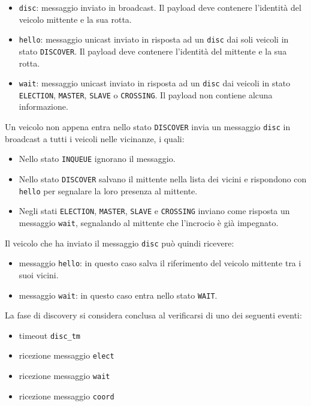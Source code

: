 \documentclass{memoir}
\begin{document}
\begin{itemize}
\item \texttt{disc}: messaggio inviato in broadcast. Il payload deve contenere
  l'identità del veicolo mittente e la sua rotta.
\item \texttt{hello}: messaggio unicast inviato in risposta ad un \texttt{disc}
  dai soli veicoli in stato \texttt{DISCOVER}. Il payload deve contenere
  l'identità del mittente e la sua rotta.
\item \texttt{wait}: messaggio unicast inviato in risposta ad un \texttt{disc}
  dai veicoli in stato \texttt{ELECTION}, \texttt{MASTER}, \texttt{SLAVE} o
  \texttt{CROSSING}. Il payload non contiene alcuna informazione.
\end{itemize} 

Un veicolo non appena entra nello stato \texttt{DISCOVER} invia un messaggio
\texttt{disc} in broadcast a tutti i veicoli nelle vicinanze, i quali:
\begin{itemize}
\item Nello stato \texttt{INQUEUE} ignorano il messaggio.
\item Nello stato \texttt{DISCOVER} salvano il mittente nella lista dei vicini e
  rispondono con \texttt{hello} per segnalare la loro presenza al mittente.
\item Negli stati \texttt{ELECTION}, \texttt{MASTER}, \texttt{SLAVE} e
  \texttt{CROSSING} inviano come risposta un messaggio \texttt{wait}, segnalando
  al mittente che l'incrocio è già impegnato.
\end{itemize}

Il veicolo che ha inviato il messaggio \texttt{disc} può quindi ricevere:
\begin{itemize}
\item messaggio \texttt{hello}: in questo caso salva il riferimento del veicolo
  mittente tra i suoi vicini.
\item messaggio \texttt{wait}: in questo caso entra nello stato \texttt{WAIT}.
\end{itemize}

La fase di discovery si considera conclusa al verificarsi di uno dei seguenti
eventi:
\begin{itemize}
\item timeout \texttt{disc\_tm}
\item ricezione messaggio \texttt{elect}
\item ricezione messaggio \texttt{wait}
\item ricezione messaggio \texttt{coord}
\end{itemize}
\end{document}
